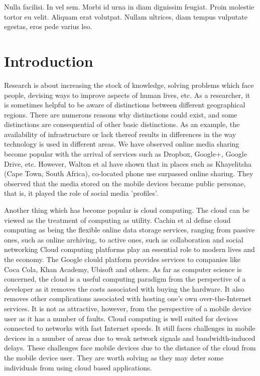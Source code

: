 \begin{savequote}[75mm] 
Nulla facilisi. In vel sem. Morbi id urna in diam dignissim feugiat. Proin molestie tortor eu velit. Aliquam erat volutpat. Nullam ultrices, diam tempus vulputate egestas, eros pede varius leo.
\end{savequote}

\chapter{Introduction}
Research is about increasing the stock of knowledge, solving problems which face people, devising ways to improve aspects of human lives, etc. As a researcher, it is sometimes helpful to be aware of distinctions
between different geographical regions. There are numerous reasons why distinctions could exist, and some distinctions are consequential of other basic distinctions. As
an example, the availability of
infrastructure or lack thereof results in differences in the way technology is used in different areas. We have observed online media sharing become
popular with the arrival of services such as Dropbox, Google+, Google Drive, etc. However, Walton et al\cite{RefWorks:26} have shown that in places such as
Khayelitsha (Cape Town, South Africa), co-located phone use surpassed online sharing. They observed that the media stored on the mobile devices became public personae, that is, it played the role of social media 'profiles'\cite[p. 403]{RefWorks:26}.\newline

Another thing which has become popular is cloud computing. The cloud can be viewed as the treatment of computing as utility. Cachin et al\cite{cachin2009trusting} define cloud computing as being the flexible online data storage services, ranging from passive ones, such as online archiving, to active ones, such as collaboration and social networking \cite[p. 81]{cachin2009trusting}
Cloud computing platforms play an essential role to modern lives and the economy. The Google clould platform provides services to companies like Coca Cola, Khan Academy, Ubisoft and others. As far as computer science is concerned, the cloud is a useful computing paradigm from the perspective of a developer
as it removes the costs associated with buying the hardware. It also removes other complications associated with hosting one's own over-the-Internet services. It is not as attractive, however, from the perspective of a mobile device user as it has a number of faults. Cloud computing is well suited for devices connected to networks with fast Internet speeds. It still faces challenges in mobile devices in a number of areas due to weak
network signals and bandwidth-induced delays. These challenges face mobile devices due to the distance of the cloud from the mobile device user. They are worth solving as they may deter some individuals from using cloud based applications.\newline

